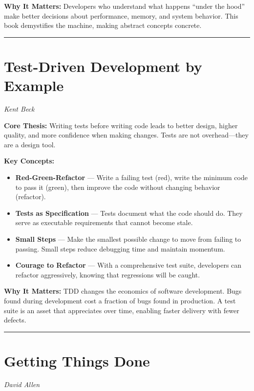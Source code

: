 \documentclass[11pt, letterpaper]{article}
\begin{document}
\textbf{Why It Matters:} Developers who understand what happens ``under the hood'' make better decisions about performance, memory, and system behavior. This book demystifies the machine, making abstract concepts concrete.

\vspace{1em}

\hrule

\vspace{1em}

\section*{Test-Driven Development by Example}
\textit{Kent Beck}

\textbf{Core Thesis:} Writing tests before writing code leads to better design, higher quality, and more confidence when making changes. Tests are not overhead---they are a design tool.

\textbf{Key Concepts:}
\begin{itemize}
    \item \textbf{Red-Green-Refactor} --- Write a failing test (red), write the minimum code to pass it (green), then improve the code without changing behavior (refactor).
    \item \textbf{Tests as Specification} --- Tests document what the code should do. They serve as executable requirements that cannot become stale.
    \item \textbf{Small Steps} --- Make the smallest possible change to move from failing to passing. Small steps reduce debugging time and maintain momentum.
    \item \textbf{Courage to Refactor} --- With a comprehensive test suite, developers can refactor aggressively, knowing that regressions will be caught.
\end{itemize}

\textbf{Why It Matters:} TDD changes the economics of software development. Bugs found during development cost a fraction of bugs found in production. A test suite is an asset that appreciates over time, enabling faster delivery with fewer defects.

\vspace{1em}

\hrule

\vspace{1em}

\section*{Getting Things Done}
\textit{David Allen}
\end{document}
